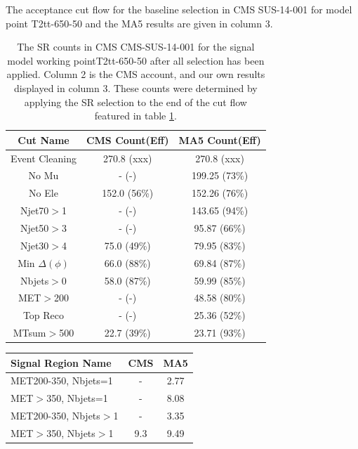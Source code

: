 \begin{table}
    \centering
    \caption{The acceptance cut flow for the baseline selection in CMS SUS-14-001 for
    model point T2tt-650-50 and the MA5 results are given in column 3.}
    \begin{tabular}{  c | c | c  }
    \hline
        \hline
    Cut Name & CMS Count(Eff) & MA5 Count(Eff)\\
    \hline
        Event Cleaning & 270.8 (xxx) & 270.8 (xxx)\\
    No Mu & - (-) & 199.25 (73\%)\\
    No Ele & 152.0 (56\%) & 152.26 (76\%)\\
    Njet70$>$1 & - (-) & 143.65 (94\%)\\
    Njet50$>$3 & - (-) & 95.87 (66\%)\\
    Njet30$>$4 & 75.0 (49\%) & 79.95 (83\%)\\
    Min $\Delta(\phi)$ & 66.0 (88\%) & 69.84 (87\%)\\
    Nbjets$>$0 & 58.0 (87\%) & 59.99 (85\%)\\
    MET$>$200 & - (-) & 48.58 (80\%)\\
    Top Reco & - (-) & 25.36 (52\%)\\
    MTsum$>$500 & 22.7 (39\%) & 23.71 (93\%)\\
\hline
    \end{tabular}
    \label{table:T2tt-650-50}
    
    \caption{The SR counts in CMS CMS-SUS-14-001 for
    the signal model working pointT2tt-650-50 after all selection has been applied. Column 2 is the CMS account,
    and our own results displayed in column 3. These counts were determined by applying the SR selection to the end of the cut flow featured in table \ref{table:T2tt-650-50}.}
    \end{table}

    \begin{table}
    \centering
    \begin{tabular}{  l | c | c  }
    \hline
    Signal Region Name & CMS & MA5\\
    \hline
    MET200-350,  Nbjets=1 & - & 2.77\\ 
 \hline 
MET$>$350,  Nbjets=1 & - & 8.08\\ 
 \hline 
MET200-350,  Nbjets$>$1 & - & 3.35\\ 
 \hline 
MET$>$350,  Nbjets$>$1 & 9.3 & 9.49\\ 
 \hline 
\hline
    \end{tabular}
    
    \end{table}


